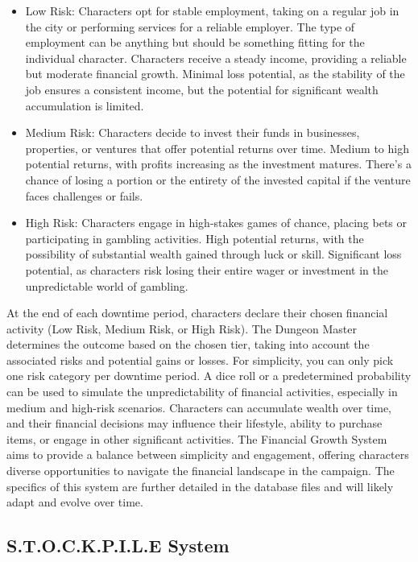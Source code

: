 \begin{itemize}
\item Low Risk: Characters opt for stable employment, taking on a regular job in the city or performing services for a reliable employer. The type of employment can be anything but should be something fitting for the individual character. Characters receive a steady income, providing a reliable but moderate financial growth. Minimal loss potential, as the stability of the job ensures a consistent income, but the potential for significant wealth accumulation is limited.

\item Medium Risk: Characters decide to invest their funds in businesses, properties, or ventures that offer potential returns over time. Medium to high potential returns, with profits increasing as the investment matures. There's a chance of losing a portion or the entirety of the invested capital if the venture faces challenges or fails.

\item High Risk: Characters engage in high-stakes games of chance, placing bets or participating in gambling activities. High potential returns, with the possibility of substantial wealth gained through luck or skill. Significant loss potential, as characters risk losing their entire wager or investment in the unpredictable world of gambling.
\end{itemize}

At the end of each downtime period, characters declare their chosen financial activity (Low Risk, Medium Risk, or High Risk). The Dungeon Master determines the outcome based on the chosen tier, taking into account the associated risks and potential gains or losses. For simplicity, you can only pick one risk category per downtime period. A dice roll or a predetermined probability can be used to simulate the unpredictability of financial activities, especially in medium and high-risk scenarios. Characters can accumulate wealth over time, and their financial decisions may influence their lifestyle, ability to purchase items, or engage in other significant activities. The Financial Growth System aims to provide a balance between simplicity and engagement, offering characters diverse opportunities to navigate the financial landscape in the campaign. The specifics of this system are further detailed in the database files and will likely adapt and evolve over time.

\subsection{S.T.O.C.K.P.I.L.E System\label{S.T.O.C.K.P.I.L.E}}

